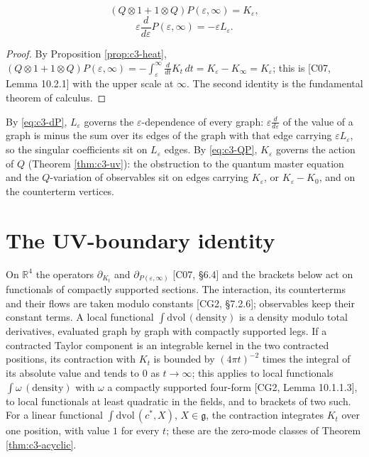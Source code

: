 \begin{proposition}
\label{prop:c3-QP}
\begin{equation}
(Q\otimes1+1\otimes Q)P(\varepsilon,\infty)=K_\varepsilon,
\label{eq:c3-QP}
\end{equation}
\begin{equation}
\varepsilon\frac{d}{d\varepsilon}P(\varepsilon,\infty)=-\varepsilon L_\varepsilon .
\label{eq:c3-dP}
\end{equation}
\end{proposition}

\begin{proof}
By Proposition \ref{prop:c3-heat}, $(Q\otimes1+1\otimes Q)P(\varepsilon,\infty)=-\int_\varepsilon^\infty\frac{d}{dt}K_t\,dt=K_\varepsilon-K_\infty=K_\varepsilon$; this is [C07, Lemma 10.2.1] with the upper scale at $\infty$. The second identity is the fundamental theorem of calculus.
\end{proof}

\begin{remark}[Two objects at $t=\varepsilon$]
\label{rem:c3-two}
By \eqref{eq:c3-dP}, $L_\varepsilon$ governs the $\varepsilon$-dependence of every graph: $\varepsilon\frac{d}{d\varepsilon}$ of the value of a graph is minus the sum over its edges of the graph with that edge carrying $\varepsilon L_\varepsilon$, so the singular coefficients sit on $L_\varepsilon$ edges. By \eqref{eq:c3-QP}, $K_\varepsilon$ governs the action of $Q$ (Theorem \ref{thm:c3-uv}): the obstruction to the quantum master equation and the $Q$-variation of observables sit on edges carrying $K_\varepsilon$, or $K_\varepsilon-K_0$, and on the counterterm vertices.
\end{remark}

\section{The UV-boundary identity}

\begin{remark}
\label{rem:c3-class}
On $\mathbb R^4$ the operators $\partial_{K_t}$ and $\partial_{P(\varepsilon,\infty)}$ [C07, §6.4] and the brackets below act on functionals of compactly supported sections. The interaction, its counterterms and their flows are taken modulo constants [CG2, §7.2.6]; observables keep their constant terms. A local functional $\int\mathrm{dvol}\,(\text{density})$ is a density modulo total derivatives, evaluated graph by graph with compactly supported legs. If a contracted Taylor component is an integrable kernel in the two contracted positions, its contraction with $K_t$ is bounded by $(4\pi t)^{-2}$ times the integral of its absolute value and tends to $0$ as $t\to\infty$; this applies to local functionals $\int\omega\,(\text{density})$ with $\omega$ a compactly supported four-form [CG2, Lemma 10.1.1.3], to local functionals at least quadratic in the fields, and to brackets of two such. For a linear functional $\int\mathrm{dvol}\,(c^*,X)$, $X\in\mathfrak g$, the contraction integrates $K_t$ over one position, with value $1$ for every $t$; these are the zero-mode classes of Theorem \ref{thm:c3-acyclic}.
\end{remark}

